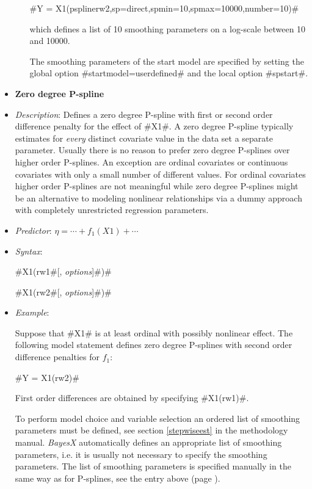 \begin{itemize}
\begin{itemize}
#Y = X1(psplinerw2,sp=direct,spmin=10,spmax=10000,number=10)#

which defines a list of 10 smoothing parameters on a log-scale between 10 and 10000.

The smoothing parameters of the start model are specified by setting the global option #startmodel=userdefined# and the local option #spstart#.





\end{itemize}
\item[]{\bf\sffamily Zero degree P-spline }

\item[] {\em Description}: Defines a zero degree P-spline with first or second order difference penalty for the effect of #X1#.
A zero degree P-spline typically estimates for {\em every} distinct covariate value in the data set a separate parameter. Usually there
is no reason to prefer zero degree P-splines over higher order P-splines. An exception are ordinal covariates or continuous
covariates with only a small number of
different values. For ordinal covariates higher order P-splines are not meaningful while zero degree P-splines might be an alternative to
modeling nonlinear relationships via a dummy approach with completely unrestricted regression parameters.
\item[] {\em Predictor}: $\eta = \cdots + f_1(X1) + \cdots $
\item[] {\em Syntax}:

#X1(rw1#[, {\em options}]#)#

#X1(rw2#[, {\em options}]#)#
\item[] {\em Example}:

Suppose that #X1# is at least ordinal with possibly
nonlinear effect. The following model statement defines zero degree P-splines with second order difference penalties for $f_1$:

#Y = X1(rw2)#

First order differences are obtained by
specifying #X1(rw1)#.

To perform model choice and variable selection an ordered list of smoothing parameters must be defined, see section \autoref{stepwiseest}
in the methodology manual. {\em BayesX} automatically defines an appropriate list of smoothing parameters, i.e. it
is usually not necessary to  specify the smoothing parameters.
The list of smoothing parameters is specified manually in the same way as for P-splines,
see the entry above (page \pageref{psplines_stepwise}).


\end{itemize}
